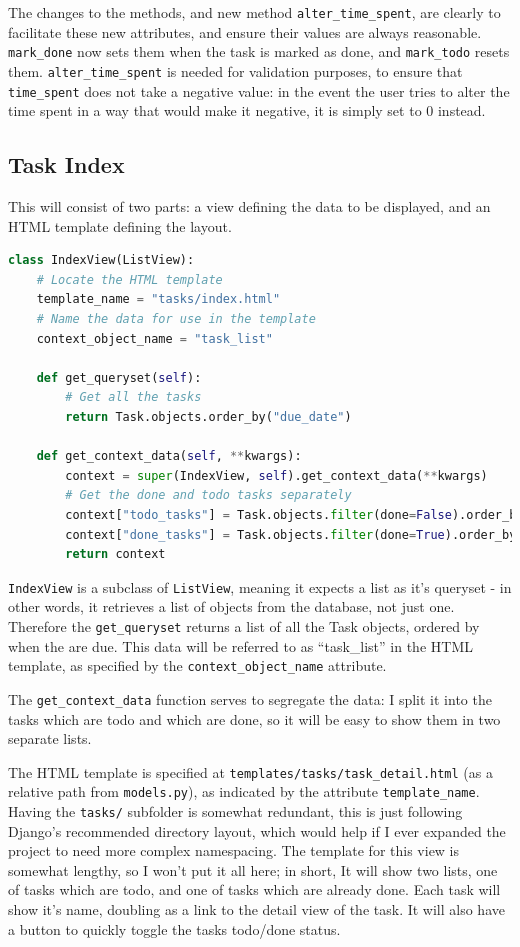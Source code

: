 \documentclass{article}
\begin{document}
The changes to the methods,
and new method \texttt{alter\_time\_spent},
are clearly to facilitate these new attributes,
and ensure their values are always reasonable.
\texttt{mark\_done} now sets them when the task is marked as done,
and \texttt{mark\_todo} resets them.
\texttt{alter\_time\_spent} is needed for validation purposes,
to ensure that \texttt{time\_spent} does not take a negative value:
in the event the user tries to alter the time spent in a way that would make it negative,
it is simply set to 0 instead.

\subsection{Task Index}
This will consist of two parts:
a view defining the data to be displayed,
and an HTML template defining the layout.

\begin{lstlisting}[language=Python]
class IndexView(ListView):
    # Locate the HTML template
    template_name = "tasks/index.html"
    # Name the data for use in the template
    context_object_name = "task_list"

    def get_queryset(self):
        # Get all the tasks
        return Task.objects.order_by("due_date")

    def get_context_data(self, **kwargs):
        context = super(IndexView, self).get_context_data(**kwargs)
        # Get the done and todo tasks separately
        context["todo_tasks"] = Task.objects.filter(done=False).order_by("due_date")
        context["done_tasks"] = Task.objects.filter(done=True).order_by("due_date")
        return context
\end{lstlisting}

\texttt{IndexView} is a subclass of \texttt{ListView},
meaning it expects a list as it's queryset -
in other words,
it retrieves a list of objects from the database,
not just one.
Therefore the \texttt{get\_queryset} returns a list of all the Task objects,
ordered by when the are due.
This data will be referred to as ``task\_list'' in the HTML template,
as specified by the \texttt{context\_object\_name} attribute.

The \texttt{get\_context\_data} function serves to segregate the data:
I split it into the tasks which are todo and which are done,
so it will be easy to show them in two separate lists.

The HTML template is specified at \texttt{templates/tasks/task\_detail.html}
(as a relative path from \texttt{models.py}),
as indicated by the attribute \texttt{template\_name}.
Having the \texttt{tasks/} subfolder is somewhat redundant,
this is just following Django's recommended directory layout,
which would help if I ever expanded the project to need more complex namespacing.
The template for this view is somewhat lengthy,
so I won't put it all here;
in short,
It will show two lists,
one of tasks which are todo,
and one of tasks which are already done.
Each task will show it's name,
doubling as a link to the detail view of the task.
It will also have a button to quickly toggle the tasks todo/done status.
\end{document}
